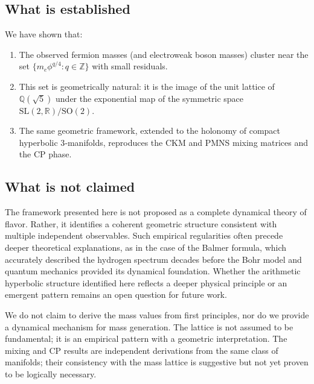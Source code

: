 \documentclass[12pt]{article}
\theoremstyle{definition}
\begin{document}
\subsection{What is established}
We have shown that:
\begin{enumerate}
\item The observed fermion masses (and electroweak boson masses) cluster near the set $\{m_e \phi^{q/4} : q\in\mathbb{Z}\}$ with small residuals.
\item This set is geometrically natural: it is the image of the unit lattice of $\mathbb{Q}(\sqrt5)$ under the exponential map of the symmetric space $\mathrm{SL}(2,\mathbb{R})/\mathrm{SO}(2)$.
\item The same geometric framework, extended to the holonomy of compact hyperbolic 3‑manifolds, reproduces the CKM and PMNS mixing matrices and the CP phase.
\end{enumerate}

\subsection{What is not claimed}

The framework presented here is not proposed as a complete dynamical theory of flavor. Rather, it identifies a coherent geometric structure consistent with multiple independent observables. Such empirical regularities often precede deeper theoretical explanations, as in the case of the Balmer formula, which accurately described the hydrogen spectrum decades before the Bohr model and quantum mechanics provided its dynamical foundation. Whether the arithmetic hyperbolic structure identified here reflects a deeper physical principle or an emergent pattern remains an open question for future work.

We do not claim to derive the mass values from first principles, nor do we provide a dynamical mechanism for mass generation. The lattice is not assumed to be fundamental; it is an empirical pattern with a geometric interpretation. The mixing and CP results are independent derivations from the same class of manifolds; their consistency with the mass lattice is suggestive but not yet proven to be logically necessary.
\end{document}
